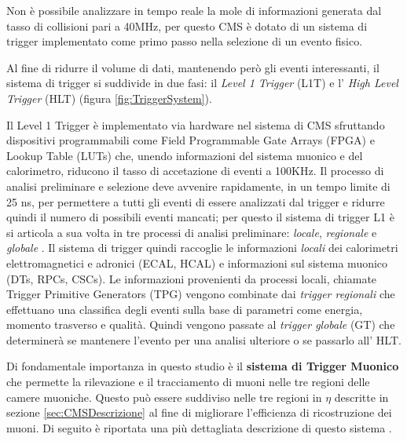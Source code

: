 Non è possibile analizzare in tempo reale la mole di informazioni generata dal tasso di collisioni pari a 40MHz, per questo CMS è dotato di un sistema di trigger implementato come primo passo nella selezione di un evento fisico. 

Al fine di ridurre il volume di dati, mantenendo però gli eventi interessanti, il sistema di trigger si suddivide in due fasi: il \textit{Level 1 Trigger} (L1T) e l' \textit{High Level Trigger} (HLT) (figura \ref{fig:TriggerSystem}). 

Il Level 1 Trigger è implementato via hardware nel sistema di CMS sfruttando dispositivi programmabili come Field Programmable Gate Arrays (FPGA) e Lookup Table (LUTs) che, unendo informazioni del sistema muonico e del calorimetro, riducono il tasso di accetazione di eventi a 100KHz. Il processo di analisi preliminare e selezione deve avvenire rapidamente, in un tempo limite di 25 ns, per permettere a tutti gli eventi di essere analizzati dal trigger e ridurre quindi il numero di possibili eventi mancati; per questo il sistema di trigger L1 è si articola a sua volta in tre processi di analisi preliminare: \textit{locale}, \textit{regionale} e \textit{globale} \cite{MasterThesisNicLai}.
Il sistema di trigger quindi raccoglie le informazioni \textit{locali} dei calorimetri elettromagnetici e adronici (ECAL, HCAL) e informazioni sul sistema muonico (DTs, RPCs, CSCs). Le informazioni provenienti da processi locali, chiamate Trigger Primitive Generators (TPG) vengono combinate dai \textit{trigger regionali} che effettuano una classifica degli eventi sulla base di parametri come energia, momento trasverso e qualità. Quindi vengono passate al \textit{trigger globale} (GT) che determinerà se mantenere l'evento per una analisi ulteriore o se passarlo all' HLT.


Di fondamentale importanza in questo studio è il \textbf{sistema di Trigger Muonico} che permette la rilevazione e il tracciamento di muoni nelle tre regioni delle camere muoniche. Questo può essere suddiviso nelle tre regioni in $\eta$ descritte in sezione \ref{sec:CMSDescrizione} al fine di migliorare l'efficienza di ricostruzione dei muoni. Di seguito è riportata una più dettagliata descrizione di questo sistema \cite{sirunyan2020performance}.

